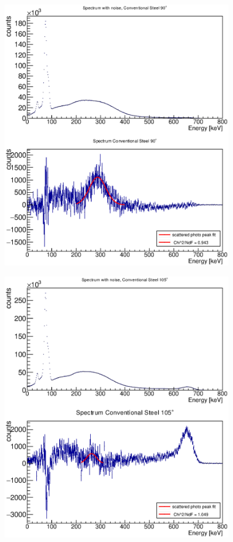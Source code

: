 \documentclass{article}
\begin{document}
\begin{figure}[H]
    \centering
    \includegraphics[width=0.9\textwidth]{Graphen/compton_spektren/90Stahl.eps}
    \caption{}
\end{figure}
\begin{figure}[H]
    \centering
    \includegraphics[width=0.9\textwidth]{Graphen/compton_spektren/105Stahl.eps}
    \caption{}
\end{figure}
\end{document}
